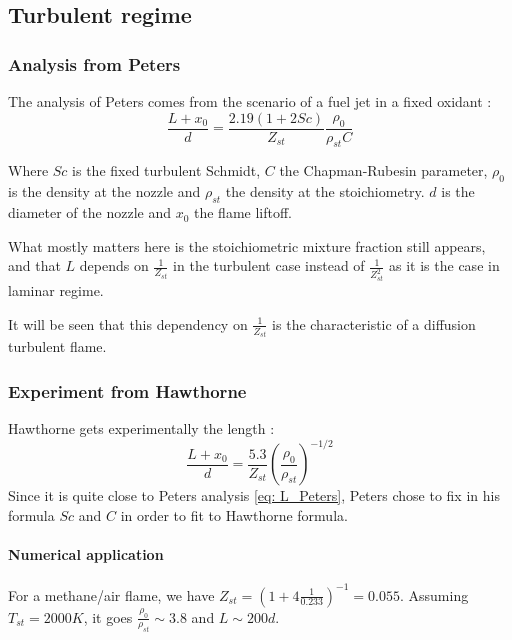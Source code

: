 \subsection{Turbulent regime}

\subsubsection{Analysis from Peters  \cite{peters_four_1997}}
The analysis of Peters comes from the scenario of a fuel jet in a fixed oxidant :
\begin{equation}\label{eq: L_Peters}
\frac{L+x_{0}}{d}=\frac{2.19 (1+2Sc)}{Z_{st}}\frac{\rho_{0}}{\rho_{st}C}
\end{equation}

Where $Sc$  is the fixed turbulent Schmidt, $C$ the Chapman-Rubesin parameter, $\rho_{0}$ is the density at the nozzle and $\rho_{st}$ the density at the stoichiometry. $d$ is the diameter of the nozzle and $x_{0}$ the flame liftoff.

What mostly matters here is the stoichiometric mixture fraction still appears, and that $L$ depends on $\frac{1}{Z_{st}}$ in the turbulent case instead of $\frac{1}{Z_{st}^2}$ as it is the case in laminar regime.

It will be seen that this dependency on $\frac{1}{Z_{st}}$ is the characteristic of a diffusion turbulent flame.

\subsubsection{Experiment from Hawthorne \cite{hawthorne_mixing_????}}



Hawthorne gets experimentally the length  :
\begin{equation}\label{eq :L_hawthorne}
\frac{L+x_{0}}{d}=\frac{5.3}{Z_{st}}(\frac{\rho_{0}}{\rho_{st}})^{-1/2}
\end{equation}
Since it is quite close to Peters analysis \ref{eq: L_Peters}, Peters chose to fix in his formula $Sc$ and $C$ in order to fit to Hawthorne formula.

\paragraph{Numerical application} For a methane/air flame, we have $Z_{st}=(1+4\frac{1}{0.233})^{-1}=0.055$. Assuming $T_{st}=2000K$, it goes $\frac{\rho_{0}}{\rho_{st}}\sim 3.8$ and $L \sim 200d$.



